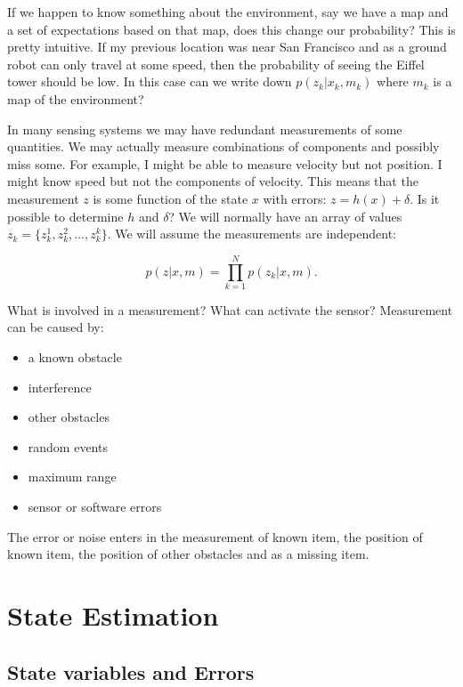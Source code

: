 If we happen to know something about the environment, say we have a map
and a set of expectations based on that map, does this change our
probability? This is pretty intuitive. If my previous location was near
San Francisco and as a ground robot can only travel at some speed, then
the probability of seeing the Eiffel tower should be low. In this case
can we write down \(p(z_k|x_k,m_k)\) where \(m_k\) is a map of the
environment?

In many sensing systems we may have redundant measurements of some
quantities. We may actually measure combinations of components and
possibly miss some. For example, I might be able to measure velocity but
not position. I might know speed but not the components of velocity.
This means that the measurement \(z\) is some function of the state
\(x\) with errors: \(z = h(x) + \delta\). Is it possible to determine
\(h\) and \(\delta\)? We will normally have an array of values
\(z_k = \{ z_k^1, z_k^2, \dots
, z_k^k\}\). We will assume the measurements are independent:

\[p(z|x,m) = \prod_{k=1}^{N}p(z_k|x,m).\]

What is involved in a measurement? What can activate the sensor?
Measurement can be caused by:

\begin{itemize}
\tightlist
\item
  a known obstacle
\item
  interference
\item
  other obstacles
\item
  random events
\item
  maximum range
\item
  sensor or software errors
\end{itemize}

The error or noise enters in the measurement of known item, the position
of known item, the position of other obstacles and as a missing item.

\hypertarget{state-estimation}{%
\section{State Estimation}\label{state-estimation}}

\hypertarget{state-variables-and-errors}{%
\subsection{State variables and
Errors}\label{state-variables-and-errors}}


